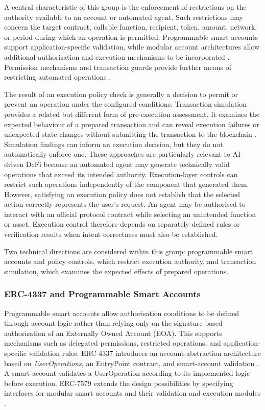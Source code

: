 A central characteristic of this group is the enforcement of
restrictions on the authority available to an account or
automated agent. Such restrictions may concern the target
contract, callable function, recipient, token, amount, network,
or period during which an operation is permitted. Programmable
smart accounts support application-specific validation, while
modular account architectures allow additional authorisation
and execution mechanisms to be incorporated
\cite{buterinERC4337AccountAbstraction2021,
erc7579MinimalModularSmartAccounts2023}.
Permission mechanisms and transaction guards provide further
means of restricting automated operations
\cite{zeroDevPermissionsSessionKeys2026,
safeSmartAccountGuards2026}.

The result of an execution policy check is generally a decision
to permit or prevent an operation under the configured
conditions. Transaction simulation provides a related but
different form of pre-execution assessment. It examines the
expected behaviour of a prepared transaction and can reveal
execution failures or unexpected state changes without
submitting the transaction to the blockchain
\cite{tenderlyTransactionSimulation2026}. Simulation findings
can inform an execution decision, but they do not automatically
enforce one. These approaches are particularly relevant to AI-driven DeFi
because an automated agent may generate technically valid
operations that exceed its intended authority. Execution-layer
controls can restrict such operations independently of the
component that generated them. However, satisfying an execution
policy does not establish that the selected action correctly
represents the user's request. An agent may be authorised to
interact with an official protocol contract while selecting an
unintended function or asset. Execution control therefore
depends on separately defined rules or verification results
when intent correctness must also be established.

Two technical directions are considered within this group:
programmable smart accounts and policy controls, which restrict
execution authority, and transaction simulation, which examines
the expected effects of prepared operations.

\subsubsection{ERC-4337 and Programmable Smart Accounts}

Programmable smart accounts allow authorisation conditions to
be defined through account logic rather than relying only on
the signature-based authorisation of an Externally Owned
Account (EOA). This supports mechanisms such as delegated
permissions, restricted operations, and application-specific
validation rules. ERC-4337 introduces an account-abstraction architecture based
on \textit{UserOperations}, an EntryPoint contract, and
smart-account validation
\cite{buterinERC4337AccountAbstraction2021,
linMeasurementInvestigationERC43372024}.
A smart account validates a UserOperation according to its
implemented logic before execution. ERC-7579 extends the
design possibilities by specifying interfaces for modular
smart accounts and their validation and execution modules
\cite{erc7579MinimalModularSmartAccounts2023}.

